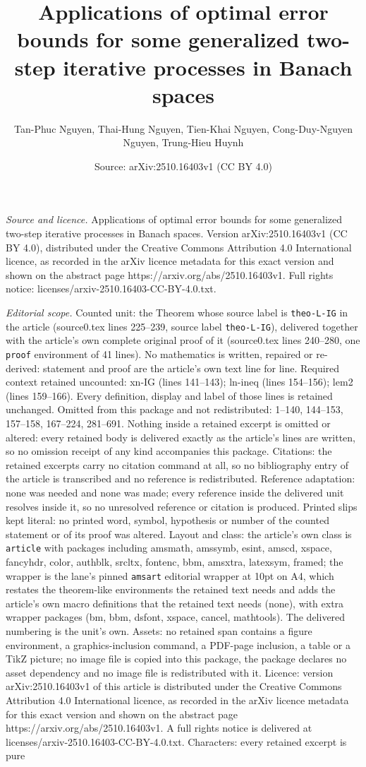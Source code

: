\documentclass[10pt,a4paper]{amsart}
\title[Applications of optimal error bounds for some generalized tw]{Applications of optimal error bounds for some generalized two-step iterative processes in Banach spaces}
\author{Tan-Phuc Nguyen, Thai-Hung Nguyen, Tien-Khai Nguyen, Cong-Duy-Nguyen Nguyen, Trung-Hieu Huynh}
\date{Source: arXiv:2510.16403v1 (CC BY 4.0)}
\begin{document}
\maketitle

\noindent\emph{Source and licence.} Applications of optimal error bounds for some generalized two-step iterative processes in Banach spaces. Version arXiv:2510.16403v1 (CC BY 4.0), distributed under the Creative Commons Attribution 4.0 International licence, as recorded in the arXiv licence metadata for this exact version and shown on the abstract page https://arxiv.org/abs/2510.16403v1. Full rights notice: licenses/arxiv-2510.16403-CC-BY-4.0.txt.\par\smallskip

\noindent\textit{Editorial scope.} Counted unit: the Theorem whose source label is \texttt{theo-L-IG} in the article (source0.tex lines 225--239, source label \texttt{theo-L-IG}), delivered together with the article's own complete original proof of it (source0.tex lines 240--280, one \texttt{proof} environment of 41 lines). No mathematics is written, repaired or re-derived: statement and proof are the article's own text line for line. Required context retained uncounted: xn-IG (lines 141--143); ln-ineq (lines 154--156); lem2 (lines 159--166). Every definition, display and label of those lines is retained unchanged. Omitted from this package and not redistributed: 1--140, 144--153, 157--158, 167--224, 281--691. Nothing inside a retained excerpt is omitted or altered: every retained body is delivered exactly as the article's lines are written, so no omission receipt of any kind accompanies this package. Citations: the retained excerpts carry no citation command at all, so no bibliography entry of the article is transcribed and no reference is redistributed. Reference adaptation: none was needed and none was made; every reference inside the delivered unit resolves inside it, so no unresolved reference or citation is produced. Printed slips kept literal: no printed word, symbol, hypothesis or number of the counted statement or of its proof was altered. Layout and class: the article's own class is \texttt{article} with packages including amsmath, amssymb, esint, amscd, xspace, fancyhdr, color, authblk, srcltx, fontenc, bbm, amsxtra, latexsym, framed; the wrapper is the lane's pinned \texttt{amsart} editorial wrapper at 10pt on A4, which restates the theorem-like environments the retained text needs and adds the article's own macro definitions that the retained text needs (none), with extra wrapper packages (bm, bbm, dsfont, xspace, cancel, mathtools). The delivered numbering is the unit's own. Assets: no retained span contains a figure environment, a graphics-inclusion command, a PDF-page inclusion, a table or a TikZ picture; no image file is copied into this package, the package declares no asset dependency and no image file is redistributed with it. Licence: version arXiv:2510.16403v1 of this article is distributed under the Creative Commons Attribution 4.0 International licence, as recorded in the arXiv licence metadata for this exact version and shown on the abstract page https://arxiv.org/abs/2510.16403v1. A full rights notice is delivered at licenses/arxiv-2510.16403-CC-BY-4.0.txt. Characters: every retained excerpt is pure 
\end{document}
